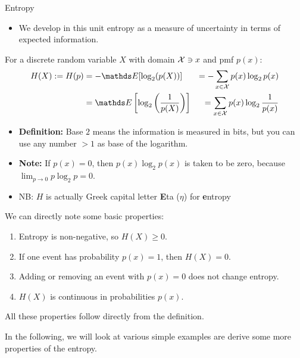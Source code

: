 \documentclass[11pt,compress,t,notes=noshow, xcolor=table]{beamer}
\begin{document}
\begin{vbframe}{Entropy}
\begin{itemize}
  \item We develop in this unit entropy as a measure of uncertainty in terms of expected information.
\end{itemize}


For a discrete random variable $X$ with domain $\mathcal{X} \ni x$ and pmf $p(x)$:
\begin{equation*}
\begin{aligned} 
  H(X) := H(p) &= - \E[\log_2(p(X))]           &= -\sum_{x \in \Xspace} p(x) \log_2 p(x)\\ 
               &=   \E\left[\log_2\left(\frac{1}{p(X)}\right)\right] &= \sum_{x \in \Xspace} p(x) \log_2 \frac{1}{p(x)} 
\end{aligned} 
\end{equation*}
    \begin{itemize}
  \item \textbf{Definition:}
Base $2$ means the information is measured in bits, but you can use any number $>1$ as base of the logarithm.
    \item \textbf{Note:} If $p(x) = 0$, then $p(x) \log_2 p(x)$ is taken to be zero, because $\lim _{p \rightarrow 0} p \log_2 p=0$. %
    \item NB: $H$ is actually Greek capital letter \textbf{E}ta ($\eta$) for \textbf{e}ntropy
  \end{itemize}

\framebreak

We can directly note some basic properties:
\vspace{0.2cm}
  \begin{enumerate}
  \setlength\itemsep{1.2em} 
    \item Entropy is non-negative, so $H(X) \geq 0$.
    \item If one event has probability $p(x) = 1$, then $H(X)=0$. 
    \item Adding or removing an event with $p(x)=0$ does not change entropy.
    \item $H(X)$ is continuous in probabilities $p(x)$.
  \end{enumerate}
  \lz
All these properties follow directly from the definition.

\vspace{0.4cm}

In the following, we will look at various simple examples are derive some more properties of the entropy.

\end{vbframe}
\end{document}
